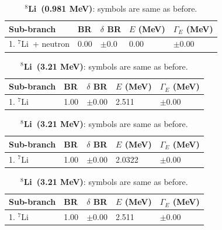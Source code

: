 \documentclass{JINST}
\newcommand{\liEIGHT}{$^{8}$Li~}
\newcommand{\liSEVEN}{$^{7}$Li~}
\begin{document}
\begin{table}[tb]
\caption{\label{tab_he_1} {\bf \liEIGHT (0.981 MeV)}: symbols are same as before.}
\begin{center}
\begin{small}
\begin{tabular}{l l l l l}
\hline
\hline
Sub-branch & BR & $\delta$ BR & $E$ (MeV) &
$\Gamma_E$ (MeV) \\
\hline
1. \liSEVEN + neutron & 0.00 & $\pm$0.0 & 0.00& $\pm$0.00 \\ 
\hline
\hline
\end{tabular}
\end{small}
\end{center}
\end{table}


\begin{table}[tb]
\caption{\label{tab_he_2} {\bf \liEIGHT (3.21 MeV)}: symbols are same as before.}
\begin{center}
\begin{small}
\begin{tabular}{l l l l l}
\hline
\hline
Sub-branch & BR & $\delta$ BR & $E$ (MeV) &
$\Gamma_E$ (MeV) \\
\hline
1. \liSEVEN & 1.00 & $\pm$0.00 & 2.511& $\pm$0.00 \\ 
\hline
\hline
\end{tabular}
\end{small}
\end{center}
\end{table}


\begin{table}[tb]
\caption{\label{tab_he_3} {\bf \liEIGHT (3.21 MeV)}: symbols are same as before.}
\begin{center}
\begin{small}
\begin{tabular}{l l l l l}
\hline
\hline
Sub-branch & BR & $\delta$ BR & $E$ (MeV) &
$\Gamma_E$ (MeV) \\
\hline
1. \liSEVEN & 1.00 & $\pm$0.00 & 2.0322& $\pm$0.00 \\ 
\hline
\hline
\end{tabular}
\end{small}
\end{center}
\end{table}

\begin{table}[tb]
\caption{\label{tab_he_3} {\bf \liEIGHT (3.21 MeV)}: symbols are same as before.}
\begin{center}
\begin{small}
\begin{tabular}{l l l l l}
\hline
\hline
Sub-branch & BR & $\delta$ BR & $E$ (MeV) &
$\Gamma_E$ (MeV) \\
\hline
1. \liSEVEN & 1.00 & $\pm$0.00 & 2.511& $\pm$0.00 \\ 
\hline
\hline
\end{tabular}
\end{small}
\end{center}
\end{table}
\end{document}
